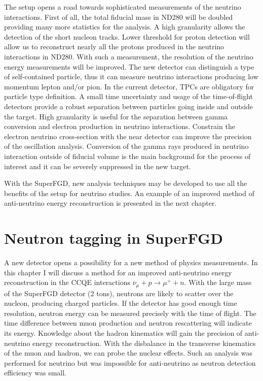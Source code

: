 \documentclass[main.tex]{subfiles}
\begin{document}
The setup opens a road towards sophisticated measurements of the neutrino interactions. First of all, the total fiducial mass in ND280 will be doubled providing many more statistics for the analysis. A high granularity allows the detection of the short nucleon tracks. Lower threshold for proton detection will allow us to reconstruct nearly all the protons produced in the neutrino interactions in ND280. With such a measurement, the resolution of the neutrino energy measurements will be improved. The new detector can distinguish a type of self-contained particle, thus it can measure neutrino interactions producing low momentum lepton and/or pion. In the current detector, TPCs are obligatory for particle type definition. A small time uncertainty and usage of the time-of-flight detectors provide a robust separation between particles going inside and outside the target. High granularity is useful for the separation between gamma conversion and electron production in neutrino interactions. Constrain the electron neutrino cross-section with the near detector can improve the precision of the oscillation analysis. Conversion of the gamma rays produced in neutrino interaction outside of fiducial volume is the main background for the process of interest and it can be severely suppressed in the new target.

With the SuperFGD, new analysis techniques may be developed to use all the benefits of the setup for neutrino studies. An example of an improved method of anti-neutrino energy reconstruction is presented in the next chapter.

\chapter{Neutron tagging in SuperFGD}
\label{ch:up:neutron}
A new detector opens a possibility for a new method of physics measurements. In this chapter I will discuss a method for an improved anti-neutrino energy reconstruction in the CCQE interactions $\overline{\nu}_\mu+p\to\mu^++n$. With the large mass of the SuperFGD detector (2 tons), neutrons are likely to scatter over the nucleon, producing charged particles. If the detector has good enough time resolution, neutron energy can be measured precisely with the time of flight. The time difference between muon production and neutron rescattering will indicate its energy. Knowledge about the hadron kinematics will gain the precision of anti-neutrino energy reconstruction. With the disbalance in the transverse kinematics of the muon and hadron, we can probe the nuclear effects. Such an analysis was performed for neutrino but was impossible for anti-neutrino as neutron detection efficiency was small.
\end{document}
